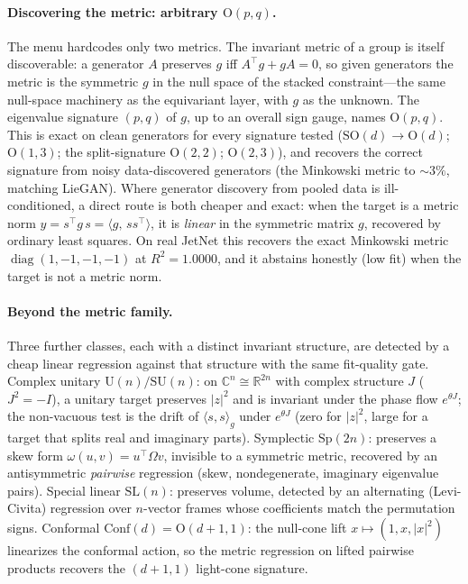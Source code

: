 \documentclass[11pt]{article}
\begin{document}
\paragraph{Discovering the metric: arbitrary $\mathrm{O}(p,q)$.} The menu hardcodes only two metrics.
The invariant metric of a group is itself discoverable: a generator $A$ preserves $g$ iff
$A^{\!\top}g+gA=0$, so given generators the metric is the symmetric $g$ in the null space of the
stacked constraint---the same null-space machinery as the equivariant layer, with $g$ as the unknown.
The eigenvalue signature $(p,q)$ of $g$, up to an overall sign gauge, names $\mathrm{O}(p,q)$. This is
exact on clean generators for every signature tested ($\mathrm{SO}(d)\to\mathrm{O}(d)$;
$\mathrm{O}(1,3)$; the split-signature $\mathrm{O}(2,2)$; $\mathrm{O}(2,3)$), and recovers the correct
signature from noisy data-discovered generators (the Minkowski metric to $\sim3\%$, matching LieGAN).
Where generator discovery from pooled data is ill-conditioned, a direct route is both cheaper and
exact: when the target is a metric norm $y=s^{\!\top}g\,s=\langle g,\,ss^{\!\top}\rangle$, it is
\emph{linear} in the symmetric matrix $g$, recovered by ordinary least squares. On real JetNet this
recovers the exact Minkowski metric $\operatorname{diag}(1,-1,-1,-1)$ at $R^2=1.0000$, and it abstains
honestly (low fit) when the target is not a metric norm.

\paragraph{Beyond the metric family.} Three further classes, each with a distinct invariant structure,
are detected by a cheap linear regression against that structure with the same fit-quality gate.
Complex unitary $\mathrm{U}(n)/\mathrm{SU}(n)$: on $\mathbb{C}^n\cong\mathbb{R}^{2n}$ with complex
structure $J$ ($J^2=-I$), a unitary target preserves $|z|^2$ and is invariant under the phase flow
$e^{\theta J}$; the non-vacuous test is the drift of $\langle s,s\rangle_g$ under $e^{\theta J}$
(zero for $|z|^2$, large for a target that splits real and imaginary parts). Symplectic
$\mathrm{Sp}(2n)$: preserves a skew form $\omega(u,v)=u^{\!\top}\Omega v$, invisible to a symmetric
metric, recovered by an antisymmetric \emph{pairwise} regression (skew, nondegenerate, imaginary
eigenvalue pairs). Special linear $\mathrm{SL}(n)$: preserves volume, detected by an alternating
(Levi-Civita) regression over $n$-vector frames whose coefficients match the permutation signs.
Conformal $\mathrm{Conf}(d)=\mathrm{O}(d+1,1)$: the null-cone lift $x\mapsto(1,x,|x|^2)$ linearizes
the conformal action, so the metric regression on lifted pairwise products recovers the $(d+1,1)$
light-cone signature.
\end{document}
